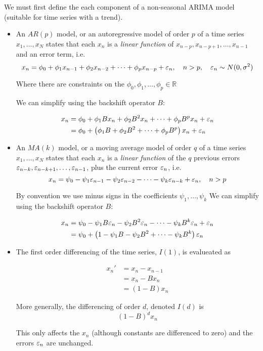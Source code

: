 We must first define the each component of a non-seasonal ARIMA model (suitable for time series with a trend).

\begin{itemize}
\item An $AR(p)$ model, or an autoregressive model of order $p$ of a time series $x_1,\dots,x_N$ states that each $x_n$ is a \textit{linear function} of $x_{n-p},x_{n-p+1},\dots,x_{n-1}$ and an error term, i.e.
$$x_n= \phi_0+\phi_1 x_{n-1}+\phi_2 x_{n-2} +\dots + \phi_p x_{n-p}+\varepsilon_n,\quad n>p,\quad \varepsilon_n\sim N(0,\sigma^2)$$

Where there are constraints on the $\phi_0,\phi_1,\dots,\phi_p\in \mathbb{R}$

We can simplify using the backshift operator $B$:

\begin{align}
x_n
&= \phi_0+\phi_1 Bx_n+\phi_2 B^2x_n +\dots + \phi_p B^px_n +\varepsilon_n\nonumber \\
&= \phi_0+\left(\phi_1 B+\phi_2 B^2 +\dots + \phi_p B^p\right)x_n +\varepsilon_n
\end{align}

\item An $MA(k)$ model, or a moving average model of order $q$ of a time series $x_1,\dots,x_N$ states that each $x_n$ is a \textit{linear function} of the $q$ previous errors $\varepsilon_{n-k},\varepsilon_{n-k+1},\dots,\varepsilon_{n-1}$, plus the current error $\varepsilon_n$, i.e. 
$$x_n= \psi_0-\psi_1 \varepsilon_{n-1}-\psi_2 \varepsilon_{n-2} -\dots - \psi_k \varepsilon_{n-k}+\varepsilon_n,\quad n>p$$

By convention we use minus signs in the coefficients $\psi_1,\dots,\psi_k$
We can simplify using the backshift operator $B$:

\begin{align}
x_n
&= \psi_0-\psi_1 B\varepsilon_n-\psi_2 B^2\varepsilon_n -\dots - \psi_k B^k\varepsilon_n + \varepsilon_n \nonumber \\
&= \psi_0+\left(1-\psi_1 B-\psi_2 B^2 +\dots - \psi_k B^k\right)\varepsilon_n 
\end{align}

\item The first order differencing of the time series, $I(1)$, is evalueated as 

\begin{align}
x_n'
&=x_n-x_{n-1}\nonumber \\
&=x_n-Bx_n \nonumber \\
&=\left(1-B\right)x_n
\end{align}

More generally, the differencing of order $d$, denoted $I(d)$ is 
$$(1-B)^d x_n$$

This only affects the $x_n$ (although constants are differenced to zero) and the errors $\varepsilon_n$ are unchanged.
\end{itemize}

